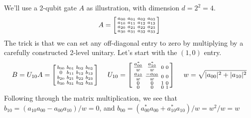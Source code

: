 We'll use a 2-qubit gate $A$ as illustration, with dimension $d=2^2=4$. 
\[
A = \begin{bsmallmatrix}
    a_{00} & a_{01} & a_{02} & a_{03} \\ 
    a_{10} & a_{11} & a_{12} & a_{13} \\
    a_{20} & a_{21} & a_{22} & a_{23} \\    
    a_{30} & a_{31} & a_{32} & a_{33}    
    \end{bsmallmatrix}
\]
The trick is that we can set any off-diagonal entry to zero by multiplying by a carefully constructed 2-level unitary. Let's start with the $(1,0)$ entry.
\[
B = U_{10} A = \begin{bsmallmatrix}
    b_{00} & b_{01} & b_{02} & b_{03} \\
    0 & b_{11} & b_{12} & b_{13} \\
    b_{20} & b_{21} & b_{22} & b_{23} \\
    b_{30} & b_{31} & b_{32} & b_{33}
    \end{bsmallmatrix}
    \  \quad
 	U_{10} = \begin{bsmallmatrix}
    \tfrac{a^*_{00}}{w} & \tfrac{a^*_{10}}{w} & 0 & 0 \\ 
    \tfrac{a_{10}}{w} & \tfrac{-a_{00}}{w} & 0 & 0 \\
    0 & 0 & 1 & 0 \\    
    0 & 0 & 0 & 1    
    \end{bsmallmatrix}
\  \quad w = \sqrt{|a_{00}|^2 + |a_{10}|^2}
\notag
\]
Following through the matrix multiplication, we see that $b_{10} = (a_{10}a_{00} - a_{00}a_{10})/w = 0$, and $b_{00} =
 (a^*_{00}a_{00} + a^*_{10}a_{10})/w = w^2/w = w$

